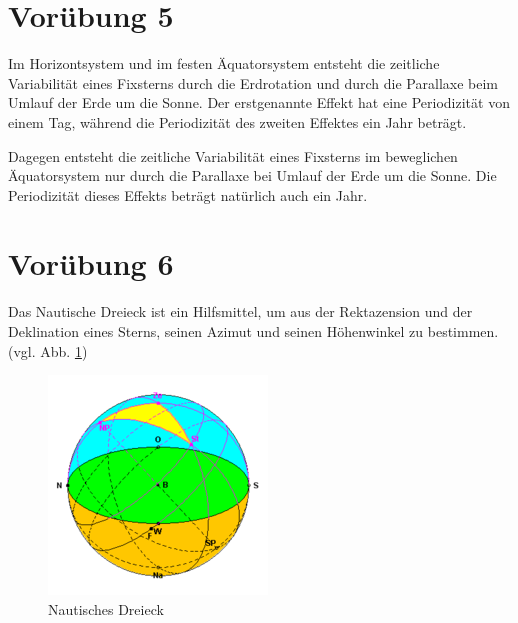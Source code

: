 \documentclass[titlepage]{scrartcl}
\begin{document}
\newpage

\section{Vorübung 5}

Im Horizontsystem und im festen Äquatorsystem entsteht die zeitliche Variabilität eines Fixsterns durch die Erdrotation und durch die Parallaxe beim Umlauf der Erde um die Sonne. Der erstgenannte Effekt hat eine Periodizität von einem Tag, während die Periodizität des zweiten Effektes ein Jahr beträgt.

Dagegen entsteht die zeitliche Variabilität eines Fixsterns im beweglichen Äquatorsystem nur durch die Parallaxe bei Umlauf der Erde um die Sonne. Die Periodizität dieses Effekts beträgt natürlich auch ein Jahr.

\section{Vorübung 6}

Das Nautische Dreieck ist ein Hilfsmittel, um aus der Rektazension und der Deklination eines Sterns, seinen Azimut und seinen Höhenwinkel zu bestimmen. (vgl. Abb. \ref{fig:Nautisches Dreieck})

\begin{figure}
        \includegraphics[width=.9\textwidth]{images/NautischesDreieck}
\caption{ Nautisches Dreieck }
\label{fig:Nautisches Dreieck}
\end{figure}
\end{document}
